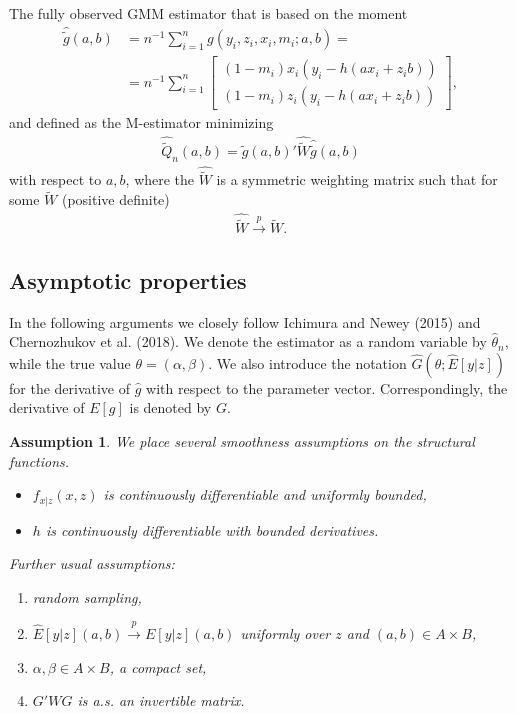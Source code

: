 \documentclass{article}
\newtheorem{assumption}{Assumption}
\theoremstyle{definition}
\theoremstyle{remark}
\begin{document}
{\color{red} The fully observed GMM estimator that is based on the moment}
\begin{align}
    \hat{\tilde{g}}(a,b)&=n^{-1}\sum_{i=1}^n g(y_i,z_i,x_i, m_i; a,b)= \\
&=n^{-1}\sum_{i=1}^n\left[\begin{array}{c}
(1-m_i) x_i(y_i- h(ax_i+z_i b))  \\
(1-m_i) z_i(y_i- h(ax_i+z_i b))
\end{array}\right], \nonumber %
\end{align}
and defined as the M-estimator minimizing
\begin{align}
\hat{\tilde{Q}}_n(a,b)= \hat{\tilde{g}}(a,b)'\hat{\tilde{W}}\hat{\tilde{g}}(a,b)
\end{align}
with respect to $a,b$, where the $\hat{\tilde{W}}$ is a symmetric weighting matrix such that for some $\tilde{W}$ (positive definite)
\begin{align}
\hat{\tilde{W}} \stackrel{p}{\rightarrow}\tilde{W}.
\end{align}


\subsection{Asymptotic properties}
In the following arguments we closely follow Ichimura and Newey (2015) and Chernozhukov et al. (2018). We denote the estimator as a random variable by $\hat{\theta}_n$, while the true value $\theta= (\alpha,\beta)$. We also introduce the notation $\hat{G}(\theta;\hat{E}[y|z])$ for the derivative of $\hat{g}$ with respect to the parameter vector. Correspondingly, the derivative of $E[g]$ is denoted by $G$.

\begin{assumption}\label{ass_regulatory1}
	We place several smoothness assumptions on the structural functions.
	\begin{itemize}
		\item $f_{x|z}(x,z)$ is continuously differentiable and uniformly bounded,
		\item $h$ is continuously differentiable with bounded derivatives.
	\end{itemize}
	Further usual assumptions:
	\begin{enumerate}
		\item random sampling,
		\item $\hat{E}[y|z](a,b)\stackrel{p}{\rightarrow} E[y|z](a,b)$ uniformly over $z$ and $(a,b) \in A \times B$,
		\item $\alpha,\beta \in A \times B$, a compact set,
		\item $G'WG$ is a.s. an invertible matrix.
	\end{enumerate}
\end{assumption}
\end{document}
